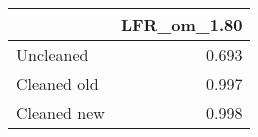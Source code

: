\begin{tabular}{lr}
\toprule
{} & LFR_om_1.80 \\
\midrule
Uncleaned   &       0.693 \\
Cleaned old &       0.997 \\
Cleaned new &       0.998 \\
\bottomrule
\end{tabular}
